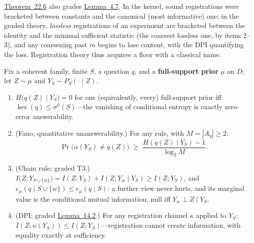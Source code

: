 \hyperlink{stmt:22.6}{Theorem~22.6} also grades \hyperlink{stmt:4.7}{Lemma~4.7}. In the kernel, sound registrations were bracketed between constants and the canonical (most informative) one; in the graded theory, \emph{lossless} registrations of an experiment are bracketed between the identity and the minimal sufficient statistic (the coarsest lossless one, by items 2--3), and any coarsening past \(m\) begins to lose content, with the DPI quantifying the loss. Registration theory thus acquires a floor with a classical name.


Fix a coherent family, finite \(S\), a question \(q\), and a \textbf{full-support prior} \(\mu\) on \(D\); let \(Z \sim \mu\) and \(Y_S \sim P_S(\cdot \mid Z)\).

\begin{thmplain}

\par\nopagebreak

\begin{enumerate}
\def\labelenumi{\arabic{enumi}.}
\item
  \(H\big(q(Z) \mid Y_S\big) = 0\) for one (equivalently, every) full-support prior iff \(\ker(q) \le \sigma^{0}(S)\)---\hspace{0pt}the vanishing of conditional entropy is exactly zero-error answerability.
\item
  (Fano, quantitative unanswerability.) For any rule, with \(M = |A_q| \ge 2\):
  \[
  \Pr\big(\alpha(Y_S) \ne q(Z)\big) \;\ge\; \frac{H(q(Z) \mid Y_S) - 1}{\log_2 M}.
  \]
\item
  (Chain rule; graded T3.) \(I\big(Z; Y_{S \cup \{w\}}\big) = I(Z; Y_S) + I(Z; Y_w \mid Y_S) \ge I(Z;Y_S)\), and \(e_\mu(q \mid S \cup \{w\}) \le e_\mu(q \mid S)\): a further view never hurts, and its marginal value is the conditional mutual information, null iff \(Y_w \perp Z \mid Y_S\).
\item
  (DPI; graded \hyperlink{stmt:14.2}{Lemma~14.2}.) For any registration channel \(\kappa\) applied to \(Y_S\): \(I(Z; \kappa(Y_S)) \le I(Z; Y_S)\)---\hspace{0pt}registration cannot create information, with equality exactly at sufficiency.
\end{enumerate}
\end{thmplain}


